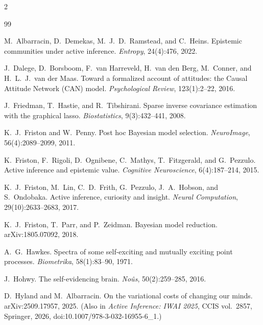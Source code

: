 \documentclass[11pt]{article}
\begin{document}
\setlength{\bibsep}{1.2pt}
\begin{multicols}{2}\raggedright
\begin{thebibliography}{99}\footnotesize

M.~Albarracin, D.~Demekas, M.~J.~D.~Ramstead, and C.~Heins.
Epistemic communities under active inference. \emph{Entropy}, 24(4):476, 2022.

J.~Dalege, D.~Borsboom, F.~van Harreveld, H.~van den Berg, M.~Conner, and H.~L.~J.~van der Maas.
Toward a formalized account of attitudes: the Causal Attitude Network (CAN) model.
\emph{Psychological Review}, 123(1):2--22, 2016.

J.~Friedman, T.~Hastie, and R.~Tibshirani.
Sparse inverse covariance estimation with the graphical lasso.
\emph{Biostatistics}, 9(3):432--441, 2008.

K.~J.~Friston and W.~Penny.
Post hoc Bayesian model selection. \emph{NeuroImage}, 56(4):2089--2099, 2011.

K.~Friston, F.~Rigoli, D.~Ognibene, C.~Mathys, T.~Fitzgerald, and G.~Pezzulo.
Active inference and epistemic value. \emph{Cognitive Neuroscience}, 6(4):187--214, 2015.

K.~J.~Friston, M.~Lin, C.~D.~Frith, G.~Pezzulo, J.~A.~Hobson, and S.~Ondobaka.
Active inference, curiosity and insight. \emph{Neural Computation}, 29(10):2633--2683, 2017.

K.~J.~Friston, T.~Parr, and P.~Zeidman.
Bayesian model reduction. arXiv:1805.07092, 2018.

A.~G.~Hawkes.
Spectra of some self-exciting and mutually exciting point processes.
\emph{Biometrika}, 58(1):83--90, 1971.

J.~Hohwy.
The self-evidencing brain. \emph{No\^us}, 50(2):259--285, 2016.

D.~Hyland and M.~Albarracin.
On the variational costs of changing our minds. arXiv:2509.17957, 2025.
(Also in \emph{Active Inference: IWAI 2025}, CCIS vol.~2857, Springer, 2026,
doi:10.1007/978-3-032-16955-6\_1.)


\end{thebibliography}
\end{multicols}
\end{document}
